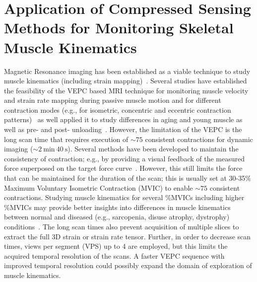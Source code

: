 \section{Application of Compressed Sensing Methods for Monitoring Skeletal Muscle Kinematics}
\label{sec: CS_paper}
Magnetic Resonance imaging has been established as a viable technique to study muscle kinematics (including strain mapping)~\cite{RNS31, RNSS4, RNCS3, RNCS4, RNCS5}. 
Several studies have established the feasibility of the VEPC based MRI technique for monitoring muscle velocity and strain rate mapping during passive muscle motion and for different contraction modes (e.g., for isometric, concentric and eccentric contraction patterns)~\cite{RNCS3, RNCS4, RNCS5} as well applied it to study differences in aging and young muscle as well as pre- and post- unloading~\cite{RNS16, Malis:2018fr}. 
However, the limitation of the VEPC is the long scan time that requires execution of $\sim 75$ consistent contractions for dynamic imaging ($\sim \SI{2}{\minute}~\SI{40}{\second}$).
Several methods have been developed to maintain the consistency of contraction; e.g., by providing a visual feedback of the measured force superposed on the target force curve~\cite{RNS16, Malis:2018fr}. 
However, this still limits the force that can be maintained for the duration of the scan; this is usually set at 30-35\% Maximum Voluntary Isometric Contraction (MVIC) to enable $\sim 75$ consistent contractions. 
Studying muscle kinematics for several \%MVICs including higher \%MVICs may provide better insights into differences in muscle kinematics between normal and diseased (e.g., sarcopenia, disuse atrophy, dystrophy) conditions~\cite{RNS16, Malis:2018fr}. 
The long scan times also prevent acquisition of multiple slices to extract the full 3D strain or strain rate tensor. 
Further, in order to decrease scan times, views per segment (VPS) up to 4 are employed, but this limits the acquired temporal resolution of the scans. 
A faster VEPC sequence with improved temporal resolution could possibly expand the domain of exploration of muscle kinematics. 

